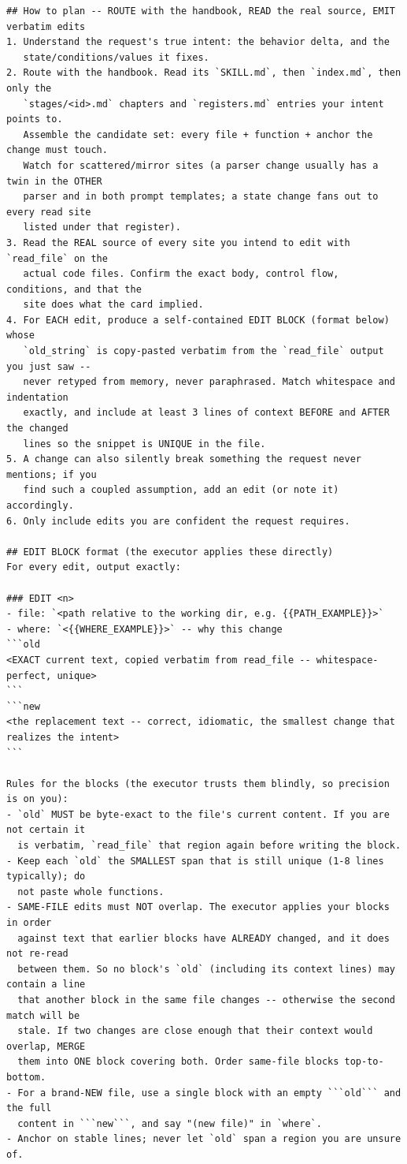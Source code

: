 \documentclass[]{ailab}
\begin{document}
\begin{lstlisting}[style=promptbox]
## How to plan -- ROUTE with the handbook, READ the real source, EMIT verbatim edits
1. Understand the request's true intent: the behavior delta, and the
   state/conditions/values it fixes.
2. Route with the handbook. Read its `SKILL.md`, then `index.md`, then only the
   `stages/<id>.md` chapters and `registers.md` entries your intent points to.
   Assemble the candidate set: every file + function + anchor the change must touch.
   Watch for scattered/mirror sites (a parser change usually has a twin in the OTHER
   parser and in both prompt templates; a state change fans out to every read site
   listed under that register).
3. Read the REAL source of every site you intend to edit with `read_file` on the
   actual code files. Confirm the exact body, control flow, conditions, and that the
   site does what the card implied.
4. For EACH edit, produce a self-contained EDIT BLOCK (format below) whose
   `old_string` is copy-pasted verbatim from the `read_file` output you just saw --
   never retyped from memory, never paraphrased. Match whitespace and indentation
   exactly, and include at least 3 lines of context BEFORE and AFTER the changed
   lines so the snippet is UNIQUE in the file.
5. A change can also silently break something the request never mentions; if you
   find such a coupled assumption, add an edit (or note it) accordingly.
6. Only include edits you are confident the request requires.

## EDIT BLOCK format (the executor applies these directly)
For every edit, output exactly:

### EDIT <n>
- file: `<path relative to the working dir, e.g. {{PATH_EXAMPLE}}>`
- where: `<{{WHERE_EXAMPLE}}>` -- why this change
```old
<EXACT current text, copied verbatim from read_file -- whitespace-perfect, unique>
```
```new
<the replacement text -- correct, idiomatic, the smallest change that realizes the intent>
```

Rules for the blocks (the executor trusts them blindly, so precision is on you):
- `old` MUST be byte-exact to the file's current content. If you are not certain it
  is verbatim, `read_file` that region again before writing the block.
- Keep each `old` the SMALLEST span that is still unique (1-8 lines typically); do
  not paste whole functions.
- SAME-FILE edits must NOT overlap. The executor applies your blocks in order
  against text that earlier blocks have ALREADY changed, and it does not re-read
  between them. So no block's `old` (including its context lines) may contain a line
  that another block in the same file changes -- otherwise the second match will be
  stale. If two changes are close enough that their context would overlap, MERGE
  them into ONE block covering both. Order same-file blocks top-to-bottom.
- For a brand-NEW file, use a single block with an empty ```old``` and the full
  content in ```new```, and say "(new file)" in `where`.
- Anchor on stable lines; never let `old` span a region you are unsure of.


\end{lstlisting}
\end{document}
